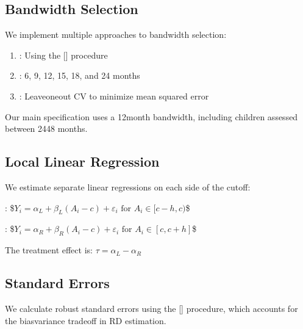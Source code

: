 \documentclass[letterpaper,10pt,english]{jupyterBook}
\begin{document}
\subsection{Bandwidth Selection}
\label{\detokenize{methodology:bandwidth-selection}}
\sphinxAtStartPar
We implement multiple approaches to bandwidth selection:
\begin{enumerate}
%
\item {} 
\sphinxAtStartPar
{}: Using the {[}{]} procedure

\item {} 
\sphinxAtStartPar
{}: 6, 9, 12, 15, 18, and 24 months

\item {} 
\sphinxAtStartPar
{}: Leave\sphinxhyphen{}one\sphinxhyphen{}out CV to minimize mean squared error

\end{enumerate}

\sphinxAtStartPar
Our main specification uses a 12\sphinxhyphen{}month bandwidth, including children assessed between 24\sphinxhyphen{}48 months.


\subsection{Local Linear Regression}
\label{\detokenize{methodology:local-linear-regression}}
\sphinxAtStartPar
We estimate separate linear regressions on each side of the cutoff:

\sphinxAtStartPar
{}:
\$\(Y_i = \alpha_L + \beta_L (A_i - c) + \varepsilon_i \text{ for } A_i \in [c-h, c)\)\$

\sphinxAtStartPar
{}:
\$\(Y_i = \alpha_R + \beta_R (A_i - c) + \varepsilon_i \text{ for } A_i \in [c, c+h]\)\$

\sphinxAtStartPar
The treatment effect is: \(\tau = \alpha_L - \alpha_R\)


\subsection{Standard Errors}
\label{\detokenize{methodology:standard-errors}}
\sphinxAtStartPar
We calculate robust standard errors using the {[}{]} procedure, which accounts for the bias\sphinxhyphen{}variance tradeoff in RD estimation.
\end{document}
